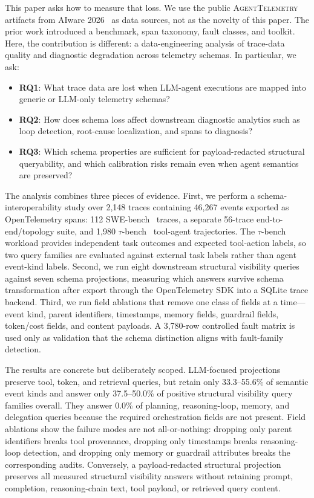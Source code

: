 \documentclass[conference]{IEEEtran}
\begin{document}
This paper asks how to measure that loss. We use the public
\textsc{AgentTelemetry} artifacts from AIware
2026~\cite{agenttelemetry_aiware,agenttelemetry_artifact} as data
sources, not as the novelty of this paper. The prior work introduced a
benchmark, span taxonomy, fault classes, and toolkit. Here, the
contribution is different: a data-engineering analysis of trace-data
quality and diagnostic degradation across telemetry schemas. In
particular, we ask:

\begin{itemize}[nosep,leftmargin=*]
\item \textbf{RQ1}: What trace data are lost when LLM-agent executions
  are mapped into generic or LLM-only telemetry schemas?
\item \textbf{RQ2}: How does schema loss affect downstream diagnostic
  analytics such as loop detection, root-cause localization, and spans
  to diagnosis?
\item \textbf{RQ3}: Which schema properties are sufficient for
  payload-redacted structural queryability, and which calibration risks
  remain even when agent semantics are preserved?
\end{itemize}

The analysis combines three pieces of evidence. First, we perform a
schema-interoperability study over 2,148 traces containing 46,267 events
exported as OpenTelemetry spans: 112 SWE-bench~\cite{swebench} traces, a
separate 56-trace end-to-end/topology suite, and 1,980
$\tau$-bench~\cite{taubench} tool-agent trajectories. The $\tau$-bench
workload provides independent task outcomes and expected tool-action
labels, so two query families are evaluated against external task
labels rather than agent event-kind labels. Second, we run eight
downstream structural visibility queries against seven schema
projections, measuring which answers survive schema transformation after
export through the OpenTelemetry SDK into a SQLite trace backend. Third,
we run field ablations that remove one class of fields at a
time---event kind, parent identifiers, timestamps, memory fields,
guardrail fields, token/cost fields, and content payloads. A 3,780-row
controlled fault matrix is used only as validation that the schema
distinction aligns with fault-family detection.

The results are concrete but deliberately scoped. LLM-focused
projections preserve tool, token, and retrieval queries, but retain only
33.3--55.6\% of semantic event kinds and answer only 37.5--50.0\% of
positive structural visibility query families overall. They answer
0.0\% of planning, reasoning-loop, memory, and delegation queries
because the required orchestration fields are not present. Field
ablations show the failure modes are not all-or-nothing: dropping only
parent identifiers breaks tool provenance, dropping only timestamps
breaks reasoning-loop detection, and dropping only memory or guardrail
attributes breaks the corresponding audits. Conversely, a
payload-redacted structural projection preserves all measured
structural visibility answers without retaining prompt, completion,
reasoning-chain text, tool payload, or retrieved query content.
\end{document}
